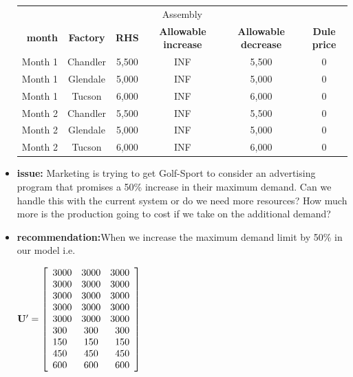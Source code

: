 \documentclass[12pt]{article}
\begin{document}
\begin{itemize}
\begin{center}
\begin{tabular}{c c c c c c }
\hline
\multicolumn{6}{c}{Assembly} \\
\ \textbf{month} &\textbf{Factory} &\textbf{RHS} & \textbf{Allowable increase} & \textbf{Allowable decrease} &  \textbf{Dule price}\\
\hline
Month 1     &Chandler  &5,500    &INF   &5,500    &0\\
Month 1     &Glendale  &5,000    &INF   &5,000   &0\\
Month 1     &Tucson    &6,000    &INF   &6,000 &0\\
Month 2     &Chandler  &5,500    &INF   &5,500       &0\\
Month 2     &Glendale  &5,000    &INF   &5,000     &0\\
Month 2     &Tucson    &6,000    &INF   &6,000  &0\\
\hline
\end{tabular}
\end{center}

	\item \textbf{issue:} Marketing is trying to get Golf-Sport to consider an advertising program that promises a 50\% increase in their maximum demand. Can we handle this with the current system or do we need more resources? How much more is the production going to cost if we take on the additional demand?
	
	\item \textbf{recommendation:}When we increase the maximum demand limit by 50\% in our model i.e.

\begin{center}
$\mathbf{U'} = 
\left[
\begin{array}{l c r}
3000 & 3000& 3000 \\
3000 & 3000& 3000 \\
3000 & 3000& 3000 \\
3000 & 3000& 3000 \\
3000 & 3000& 3000 \\
300  &300  & 300  \\
150  &150  & 150  \\
450  &450  & 450  \\
600  &600  & 600  
\end{array}
\right]
$
\end{center}


\end{itemize}
\end{document}
